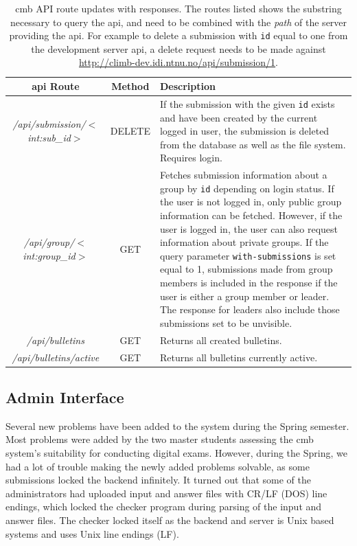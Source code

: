 \begin{table}[h!]
    \centering
    \begin{tabular}{ | c | c | p{4cm} | }
    \hline
    \textbf{\gls{api} Route} & \textbf{Method} & \textbf{Description} \\
    \hline
    \textit{/api/submission/$<$int:sub\_id$>$} & DELETE & If the submission with the given \texttt{id} exists and have been created by the current logged in user, the submission is deleted from the database as well as the file system. Requires login.\\ \hline
    \textit{/api/group/$<$int:group\_id$>$} & GET & Fetches submission information about a group by \texttt{id} depending on login status. If the user is not logged in, only public group information can be fetched. However, if the user is logged in, the user can also request information about private groups. If the query parameter \texttt{with-submissions} is set equal to 1, submissions made from group members is included in the response if the user is either a group member or leader. The response for leaders also include those submissions set to be unvisible. \\ \hline
    \textit{/api/bulletins} & GET & Returns all created bulletins. \\ \hline
    \textit{/api/bulletins/active} & GET & Returns all bulletins currently active. \\ \hline
    \end{tabular}
    \caption[\gls{cmb} API route updates with responses]{\gls{cmb} API route updates with responses. The routes listed shows the substring necessary to query the \gls{api}, and need to be combined with the \textit{path} of the server providing the \gls{api}. For example to delete a submission with \texttt{id} equal to one from the development server \gls{api}, a delete request needs to be made against \url{http://climb-dev.idi.ntnu.no/api/submission/1}.}
    \label{tab:cmb-updated-routes}
\end{table}
\clearpage
\subsection{Admin Interface}
Several new problems have been added to the system during the Spring semester. Most problems were added by the two master students assessing the \gls{cmb} system's suitability for conducting digital exams. However, during the Spring, we had a lot of trouble making the newly added problems solvable, as some submissions locked the backend infinitely. It turned out that some of the administrators had uploaded input and answer files with CR/LF (DOS) line endings, which locked the checker program during parsing of the input and answer files. The checker locked itself as the backend and server is Unix based systems and uses Unix line endings (LF). \\

